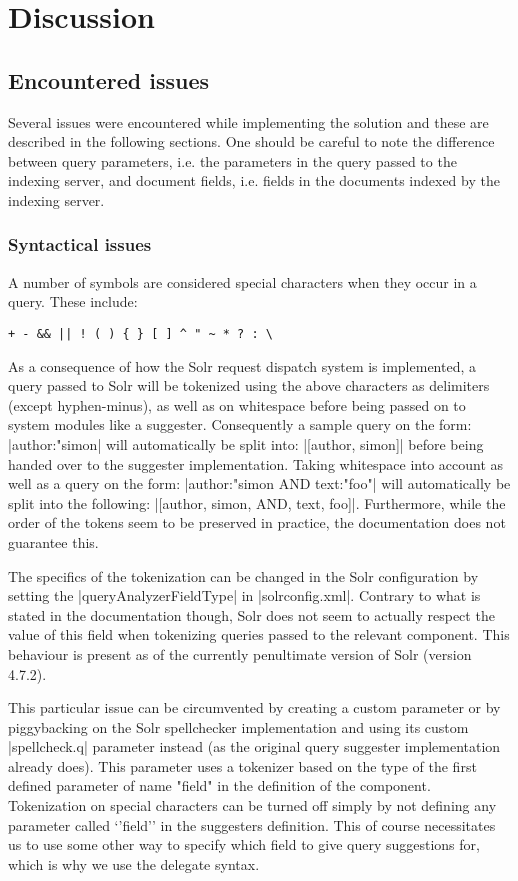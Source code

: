 \section{Discussion}\label{discussion}

\subsection{Encountered issues}

Several issues were encountered while implementing the solution and these are described in the following sections. One should be careful to note the difference between query parameters, i.e. the parameters in the query passed to the indexing server, and document fields, i.e. fields in the documents indexed by the indexing server.

\subsubsection{Syntactical issues}

A number of symbols are considered special characters when they occur in a query. These include\cite{QUERY}:
\begin{verbatim}
+ - && || ! ( ) { } [ ] ^ " ~ * ? : \
\end{verbatim}

As a consequence of how the Solr request dispatch system is implemented, a query passed to Solr will be tokenized using the above characters as delimiters (except hyphen-minus), as well as on whitespace before being passed on to system modules like a suggester.
Consequently a sample query on the form: |author:"simon| will automatically be split into: |[author, simon]|
before being handed over to the suggester implementation.
Taking whitespace into account as well as a query on the form: |author:"simon AND text:"foo"| will automatically be split into the following: |[author, simon, AND, text, foo]|.
Furthermore, while the order of the tokens seem to be preserved in practice, the documentation does not guarantee this.

The specifics of the tokenization can be changed in the Solr configuration by setting the |queryAnalyzerFieldType| in |solrconfig.xml|. Contrary to what is stated in the documentation though, Solr does not seem to actually respect the value of this field when tokenizing queries passed to the relevant component. This behaviour is present as of the currently penultimate version of Solr (version 4.7.2).

This particular issue can be circumvented by creating a custom parameter or by piggybacking on the Solr spellchecker implementation and using its custom |spellcheck.q| parameter instead (as the original query suggester implementation already does).
This parameter uses a tokenizer based on the type of the first defined parameter of name "field" in the definition of the component.\cite{FIELDTYPE}
Tokenization on special characters can be turned off simply by not defining any parameter called ‘’field’’ in the suggesters definition. This of course necessitates us to use some other way to specify which field to give query suggestions for, which is why we use the delegate syntax.

